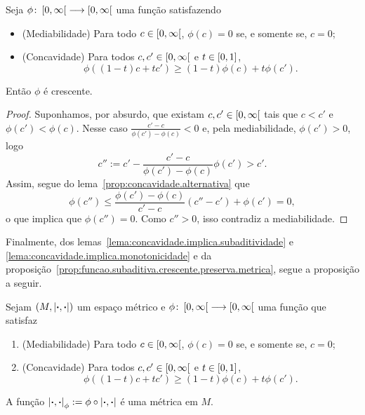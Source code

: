 \begin{lemma}
\label{lema:concavidade.implica.monotonicidade}
Seja $\phi\colon \allowbreak \left[0,\allowbreak \infty\right[ \longrightarrow \left[0,\allowbreak \infty\right[$ uma função satisfazendo
	\begin{itemize}
	\item (Mediabilidade) Para todo $c \in \left[0,\allowbreak \infty\right[$, $\phi(c) = 0$ se, e somente se, $c=0$;
	\item (Concavidade) Para todos $c,c' \in \left[0,\allowbreak \infty\right[$ e $t \in \left[0,\allowbreak 1\right]$,
		\[
		\phi((1-t)c + tc') \geq (1-t)\phi(c) + t\phi(c').
		\]
	\end{itemize}
Então $\phi$ é crescente.
\end{lemma}
\begin{proof}
Suponhamos, por absurdo, que existam $c,c' \in \left[0,\allowbreak \infty\right[$ tais que $c<c'$ e $\phi(c') < \phi(c)$. Nesse caso $\frac{c'-c}{\phi(c')-\phi(c)} < 0$ e, pela mediabilidade, $\phi(c') > 0$, logo
	\[
	c'' := c' - \frac{c'-c}{\phi(c')-\phi(c)}\phi(c') > c'.
	\]
Assim, segue do lema~\ref{prop:concavidade.alternativa} que
	\[
	\phi(c'') \leq \frac{\phi(c') - \phi(c)}{c'-c}(c''-c') + \phi(c') = 0,
	\]
o que implica que $\phi(c'')=0$. Como $c''>0$, isso contradiz a mediabilidade.
\end{proof}

Finalmente, dos lemas~\ref{lema:concavidade.implica.subaditividade} e \ref{lema:concavidade.implica.monotonicidade} e da proposição~\ref{prop:funcao.subaditiva.crescente.preserva.metrica}, segue a proposição a seguir.

\begin{proposition}
\label{prop:funcao.concava.preserva.metrica}
Sejam $(M, \left\vert{\bm{\cdot}},{\bm{\cdot}}\right\vert)$ um espaço métrico e $\phi\colon \allowbreak \left[0,\allowbreak \infty\right[ \longrightarrow \left[0,\allowbreak \infty\right[$ uma função que satisfaz
\begin{enumerate}
	\item (Mediabilidade) Para todo $c \in \left[0,\allowbreak \infty\right[$, $\phi(c) = 0$ se, e somente se, $c=0$;
	\item (Concavidade) Para todos $c,c' \in \left[0,\allowbreak \infty\right[$ e $t \in \left[0,\allowbreak 1\right]$,
		\[
		\phi((1-t)c + tc') \geq (1-t)\phi(c) + t\phi(c').
		\]
\end{enumerate}
A função $\left\vert{\bm{\cdot}},{\bm{\cdot}}\right\vert_\phi := \phi \circ \left\vert{\bm{\cdot}},{\bm{\cdot}}\right\vert$
é uma métrica em $M$.
\end{proposition}


